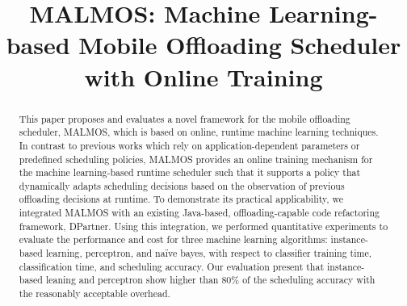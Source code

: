 \documentclass[10pt, conference, compsocconf]{IEEEtran}
\begin{document}


\title{MALMOS: Machine Learning-based Mobile Offloading Scheduler with Online
Training}


\author{
\and
{}
}

\maketitle

\begin{abstract}
%
This paper proposes and evaluates a novel framework for the mobile
offloading scheduler, MALMOS, which is based on online, runtime machine
learning techniques.
%
In contrast to previous works which rely on application-dependent
parameters or predefined scheduling policies, MALMOS provides an online
training mechanism for the machine learning-based runtime scheduler such
that it supports a policy that dynamically adapts scheduling decisions
based on the observation of previous offloading decisions at runtime.
%
To demonstrate its practical applicability, we integrated MALMOS with an
existing Java-based, offloading-capable code refactoring framework,
DPartner.
%
Using this integration, we performed quantitative experiments to
evaluate the performance and cost for three machine learning
algorithms: instance-based learning, perceptron, and na\"{i}ve bayes,
with respect to classifier training time, classification time, and
scheduling accuracy.
%
Our evaluation present that instance-based leaning and perceptron show
higher than 80\% of the scheduling accuracy with the reasonably
acceptable overhead.
%
%
%
%
\end{abstract}
\end{document}
